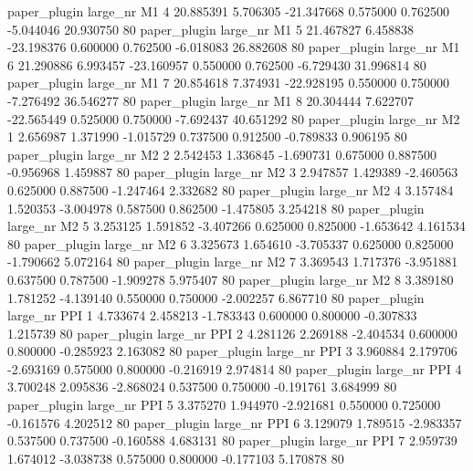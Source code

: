        paper_plugin   large_nr       M1                 4 20.885391  5.706305 -21.347668 0.575000 0.762500 -5.044046   20.930750 80
       paper_plugin   large_nr       M1                 5 21.467827  6.458838 -23.198376 0.600000 0.762500 -6.018083   26.882608 80
       paper_plugin   large_nr       M1                 6 21.290886  6.993457 -23.160957 0.550000 0.762500 -6.729430   31.996814 80
       paper_plugin   large_nr       M1                 7 20.854618  7.374931 -22.928195 0.550000 0.750000 -7.276492   36.546277 80
       paper_plugin   large_nr       M1                 8 20.304444  7.622707 -22.565449 0.525000 0.750000 -7.692437   40.651292 80
       paper_plugin   large_nr       M2                 1  2.656987  1.371990  -1.015729 0.737500 0.912500 -0.789833    0.906195 80
       paper_plugin   large_nr       M2                 2  2.542453  1.336845  -1.690731 0.675000 0.887500 -0.956968    1.459887 80
       paper_plugin   large_nr       M2                 3  2.947857  1.429389  -2.460563 0.625000 0.887500 -1.247464    2.332682 80
       paper_plugin   large_nr       M2                 4  3.157484  1.520353  -3.004978 0.587500 0.862500 -1.475805    3.254218 80
       paper_plugin   large_nr       M2                 5  3.253125  1.591852  -3.407266 0.625000 0.825000 -1.653642    4.161534 80
       paper_plugin   large_nr       M2                 6  3.325673  1.654610  -3.705337 0.625000 0.825000 -1.790662    5.072164 80
       paper_plugin   large_nr       M2                 7  3.369543  1.717376  -3.951881 0.637500 0.787500 -1.909278    5.975407 80
       paper_plugin   large_nr       M2                 8  3.389180  1.781252  -4.139140 0.550000 0.750000 -2.002257    6.867710 80
       paper_plugin   large_nr      PPI                 1  4.733674  2.458213  -1.783343 0.600000 0.800000 -0.307833    1.215739 80
       paper_plugin   large_nr      PPI                 2  4.281126  2.269188  -2.404534 0.600000 0.800000 -0.285923    2.163082 80
       paper_plugin   large_nr      PPI                 3  3.960884  2.179706  -2.693169 0.575000 0.800000 -0.216919    2.974814 80
       paper_plugin   large_nr      PPI                 4  3.700248  2.095836  -2.868024 0.537500 0.750000 -0.191761    3.684999 80
       paper_plugin   large_nr      PPI                 5  3.375270  1.944970  -2.921681 0.550000 0.725000 -0.161576    4.202512 80
       paper_plugin   large_nr      PPI                 6  3.129079  1.789515  -2.983357 0.537500 0.737500 -0.160588    4.683131 80
       paper_plugin   large_nr      PPI                 7  2.959739  1.674012  -3.038738 0.575000 0.800000 -0.177103    5.170878 80
